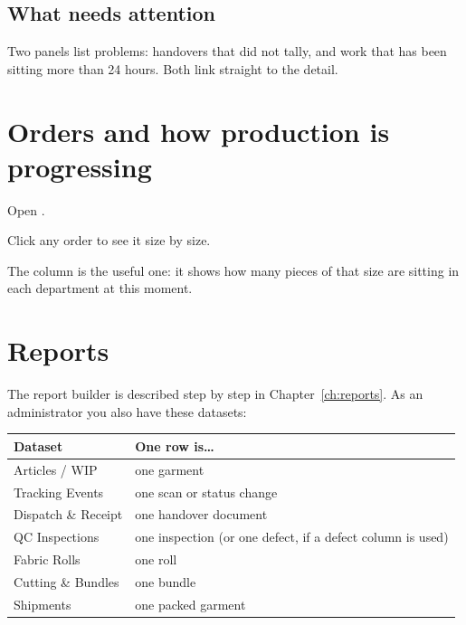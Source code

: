 \subsection{What needs attention}

Two panels list problems: handovers that did not tally, and work that has been
sitting more than 24 hours. Both link straight to the detail.

\section{Orders and how production is progressing}

Open .


Click any order to see it size by size.


The  column is the useful one: it shows how many pieces of
that size are sitting in each department at this moment.

\section{Reports}

The report builder is described step by step in Chapter~\ref{ch:reports}. As
an administrator you also have these datasets:

\begin{table}[H]
\centering
\small
\begin{tabular}{@{}p{40mm}p{98mm}@{}}
\toprule
\textbf{Dataset} & \textbf{One row is\ldots} \\
\midrule
Articles / WIP        & one garment \\
Tracking Events       & one scan or status change \\
Dispatch \& Receipt   & one handover document \\
QC Inspections        & one inspection (or one defect, if a defect column is used) \\
Fabric Rolls          & one roll \\
Cutting \& Bundles    & one bundle \\
Shipments             & one packed garment \\
\bottomrule
\end{tabular}
\end{table}


